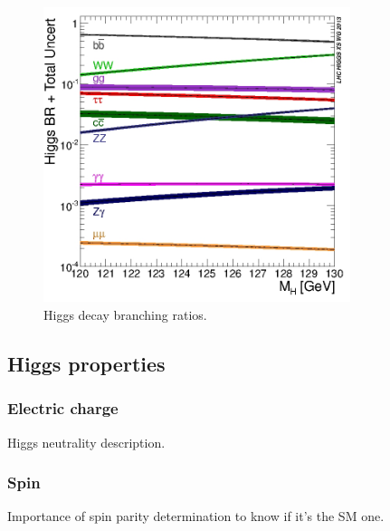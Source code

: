 \begin{figure}[!Hhtbp]
  \begin{center}
    \includegraphics[width=0.8\textwidth]{figs/Higgs_BR_120-130.jpg}
    \caption{Higgs decay branching ratios.}
    \label{fig:HiggsBrs}
  \end{center}
\end{figure}

\subsection{Higgs properties}

\subsubsection{Electric charge}

Higgs neutrality description.

\subsubsection{Spin}

Importance of spin parity determination to know if it's the SM one. 

